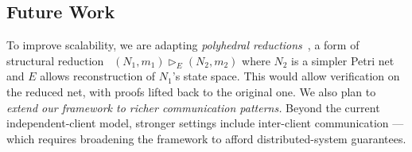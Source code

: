 \subsection{Future Work}
To improve scalability, we are adapting \textit{polyhedral reductions}~\cite{AmBeDa21}, a form of structural reduction~\cite{Be87,BeLeDa20} $(N_1, m_1) \vartriangleright_E (N_2, m_2)$ where $N_2$ is a simpler Petri net and $E$ allows reconstruction of $N_1$’s state space. This would allow verification on the reduced net, with proofs lifted back to the original one.
%
We also plan to \textit{extend our framework to richer communication patterns.} Beyond the current independent-client model, stronger settings include inter-client communication ---
which requires 
broadening the framework to afford distributed-system guarantees.
%
%
%
%
%
%
%
%
%


